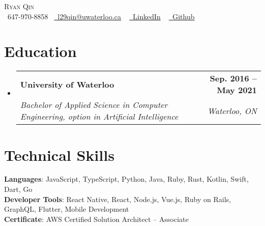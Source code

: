 \documentclass[letterpaper,11pt]{article}
\makeatletter
\newcommand{\resumeSubheading}[4]{
  \vspace{-2pt}\item
    \begin{tabular*}{1.0\textwidth}[t]{l@{\extracolsep{\fill}}r}
      \textbf{#1} & \textbf{\small #2} \\
      \textit{\small#3} & \textit{\small #4} \\
    \end{tabular*}\vspace{-7pt}
}
\newcommand{\resumeSubHeadingListStart}{\begin{itemize}[leftmargin=0.0in, label={}]}
\newcommand{\resumeSubHeadingListEnd}{\end{itemize}}
\makeatother
\begin{document}
\begin{center}
    {\Huge \scshape Ryan Qin} \\ \vspace{1pt}
    \small \raisebox{-0.1\height}\faPhone\ 647-970-8858~ \href{l29qin@uwaterloo.ca}{\raisebox{-0.2\height}\faEnvelope\  \underline{l29qin@uwaterloo.ca}} ~ 
    \href{https://www.linkedin.com/in/ryan-qin-4b8157130}{\raisebox{-0.2\height}\faLinkedin\ \underline{LinkedIn}}  ~
    \href{https://github.com/lang98}{\raisebox{-0.2\height}\faGithub\ \underline{Github}}
    \vspace{-8pt}
\end{center}


\section{Education}
  \resumeSubHeadingListStart
    \resumeSubheading
      {University of Waterloo}{Sep. 2016 -- May 2021}
      {Bachelor of Applied Science in Computer Engineering, option in Artificial Intelligence}{Waterloo, ON}
  \resumeSubHeadingListEnd

%
\section{Technical Skills}
  \begin{itemize}[leftmargin=0.15in, label={}]
    \small{\item{
      \textbf{Languages}{: JavaScript, TypeScript, Python, Java, Ruby, Rust, Kotlin, Swift, Dart, Go} \\
      \textbf{Developer Tools}{: React Native, React, Node.js, Vue.js, Ruby on Rails, GraphQL, Flutter, Mobile Development} \\
      \textbf{Certificate}{: AWS Certified Solution Architect – Associate} \\
    }}
  \end{itemize}
\vspace{-16pt}
\end{document}
